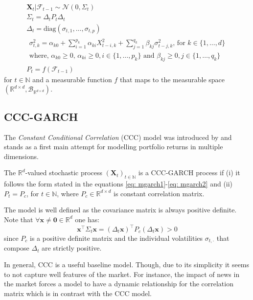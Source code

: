 \documentclass[a4paper, oneside]{discothesis}
\begin{document}
\begin{gather}
    \mathbf{X}_t|\mathcal{F}_{t-1}\sim\mathcal{N}(0, \Sigma_t)\label{eq: mgarch1}\\
    \Sigma_t = \Delta_t P_t \Delta_t\\
    \Delta_t = \text{diag}(\sigma_{t, 1}, \dots, \sigma_{t,p})\\
    \begin{split}\label{eq: mgarch2}
    \sigma_{t, k}^2 = \alpha_{k0}+\sum_{i=1}^{p_k}\alpha_{ki}X^2_{t-i, k}+\sum_{j=1}^{q_k}\beta_{kj}\sigma^2_{t-j, k}\text{, for }k\in\{1,\dots ,d \}\\ \text{where, } \alpha_{k0} \geq 0\text{, } \alpha_{ki}\geq0, i\in\{1, \dots, p_k\}\text{ and } \beta_{kj}\geq0, j\in\{1, \dots, q_k\}
    \end{split}\\
    P_t = f(\mathcal{F}_{t-1})
\end{gather}
for $t\in \mathbb{N}$ and a measurable function $f$ that maps to the measurable space $\left( \mathbb{R}^{d\times d}, \mathcal{B}_{\mathbb{R}^{d\times d}} \right)$.

\subsection{CCC-GARCH}
The \textit{Constant Conditional Correlation} (CCC) model was introduced by \cite{CCC} and stands as a first main attempt for modelling portfolio returns in multiple dimensions.

\begin{definition}
The $\mathbb{R}^d$-valued stochastic process $(\mathbf{X}_t)_{t\in\mathbb{N}}$ is a CCC-GARCH process if (i) it follows the form stated in the equations \ref{eq: mgarch1}-\ref{eq: mgarch2} and (ii) $P_t = P_c$, for $t\in \mathbb{N}$, where $P_c\in\mathbb{R}^{d\times d}$ is constant correlation matrix. 
\end{definition}

  \begin{mdframed}\begin{remark}
The model is well defined as the covariance matrix is always positive definite. Note that $\forall \mathbf{x}\neq\mathbf{0}\in\mathbb{R}^d$ one has:
\[\mathbf{x}^\intercal\Sigma_t\mathbf{x} = \left(\Delta_t\mathbf{x}\right)^\intercal P_c \left(\Delta_t\mathbf{x}\right)>0\]
since $P_c$ is a positive definite matrix and the individual volatilities $\sigma_{t, \cdot}$ that compose $\Delta_t$ are strictly positive.
\end{remark}\end{mdframed}  
In general, CCC is a useful baseline model. Though, due to its simplicity it seems to not capture well features of the market. For instance, the impact of news in the market forces a model to have a dynamic relationship for the correlation matrix which is in contrast with the CCC model.
\end{document}
